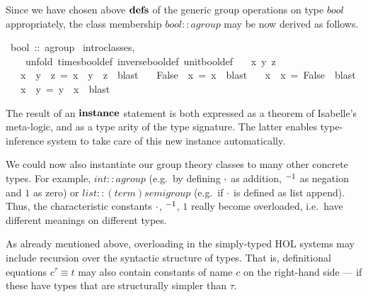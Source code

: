 \begin{isabelle}
\begin{isamarkuptext}
 \medskip Since we have chosen above ${\mathord{\mathbf{defs}}}$ of the generic group
 operations on type $bool$ appropriately, the class membership $bool
 :: agroup$ may be now derived as follows.%
\end{isamarkuptext}%
\ bool\ ::\ agroup\isanewline
{}\ {\isacharparenleft}intro{\isacharunderscore}classes,\isanewline
\ \ \ \ unfold\ times{\isacharunderscore}bool{\isacharunderscore}def\ inverse{\isacharunderscore}bool{\isacharunderscore}def\ unit{\isacharunderscore}bool{\isacharunderscore}def{\isacharparenright}\isanewline
\ \ \ x\ y\ z\isanewline
\ \ \ {\isachardoublequote}{\isacharparenleft}{\isacharparenleft}x\ {\isasymnoteq}\ y{\isacharparenright}\ {\isasymnoteq}\ z{\isacharparenright}\ =\ {\isacharparenleft}x\ {\isasymnoteq}\ {\isacharparenleft}y\ {\isasymnoteq}\ z{\isacharparenright}{\isacharparenright}{\isachardoublequote}\ \ blast\isanewline
\ \ \ {\isachardoublequote}{\isacharparenleft}False\ {\isasymnoteq}\ x{\isacharparenright}\ =\ x{\isachardoublequote}\ \ blast\isanewline
\ \ \ {\isachardoublequote}{\isacharparenleft}x\ {\isasymnoteq}\ x{\isacharparenright}\ =\ False{\isachardoublequote}\ \ blast\isanewline
\ \ \ {\isachardoublequote}{\isacharparenleft}x\ {\isasymnoteq}\ y{\isacharparenright}\ =\ {\isacharparenleft}y\ {\isasymnoteq}\ x{\isacharparenright}{\isachardoublequote}\ \ blast\isanewline
{}%
\begin{isamarkuptext}%
The result of an $\emph{\bf instance}$ statement is both expressed
 as a theorem of Isabelle's meta-logic, and as a type arity of the
 type signature.  The latter enables type-inference system to take
 care of this new instance automatically.

 \medskip We could now also instantiate our group theory classes to
 many other concrete types.  For example, $int :: agroup$ (e.g.\ by
 defining $\cdot$ as addition, $\emph{${}^{-1}$}$ as negation and $1$ as
 zero) or $list :: (term)semigroup$ (e.g.\ if $\cdot$ is defined as
 list append).  Thus, the characteristic constants $\cdot$,
 $\emph{${}^{-1}$}$, $1$ really become overloaded, i.e.\ have different
 meanings on different types.%
\end{isamarkuptext}%
%
%
\begin{isamarkuptext}%
As already mentioned above, overloading in the simply-typed HOL
 systems may include recursion over the syntactic structure of types.
 That is, definitional equations $c^\tau \equiv t$ may also contain
 constants of name $c$ on the right-hand side --- if these have types
 that are structurally simpler than $\tau$.


\end{isamarkuptext}
\end{isabelle}
